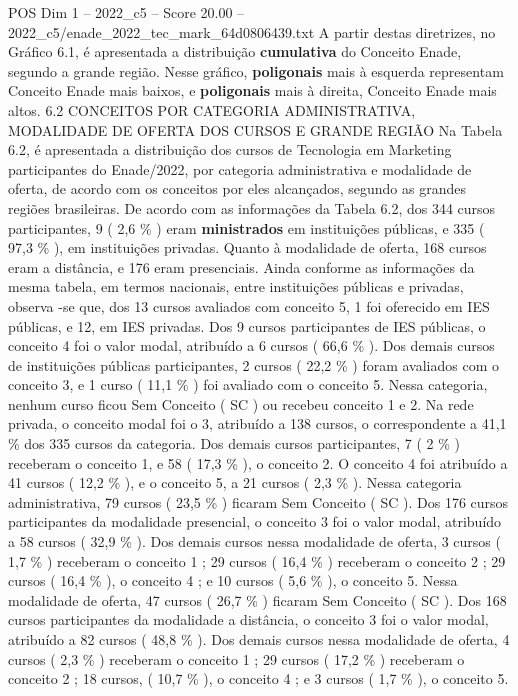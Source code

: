 \begin{textsample}{POS Dim 1 – 2022\_c5 – Score 20.00 – 2022\_c5/enade\_2022\_tec\_mark\_64d0806439.txt}
A partir destas diretrizes, no Gráfico 6.1, é apresentada a distribuição \textbf{cumulativa} do Conceito Enade, segundo a grande região.
Nesse gráfico, \textbf{poligonais} mais à esquerda representam Conceito Enade mais baixos, e \textbf{poligonais} mais à direita, Conceito Enade mais altos. 6.2 CONCEITOS POR CATEGORIA ADMINISTRATIVA, MODALIDADE DE OFERTA DOS CURSOS E GRANDE REGIÃO Na Tabela 6.2, é apresentada a distribuição dos cursos de Tecnologia em Marketing participantes do Enade/2022, por categoria administrativa e modalidade de oferta, de acordo com os conceitos por eles alcançados, segundo as grandes regiões brasileiras.
De acordo com as informações da Tabela 6.2, dos 344 cursos participantes, 9 ( 2,6 \% ) eram \textbf{ministrados} em instituições públicas, e 335 ( 97,3 \% ), em instituições privadas.
Quanto à modalidade de oferta, 168 cursos eram a distância, e 176 eram presenciais.
Ainda conforme as informações da mesma tabela, em termos nacionais, entre instituições públicas e privadas, observa -se que, dos 13 cursos avaliados com conceito 5, 1 foi oferecido em IES públicas, e 12, em IES privadas.
Dos 9 cursos participantes de IES públicas, o conceito 4 foi o valor modal, atribuído a 6 cursos ( 66,6 \% ).
Dos demais cursos de instituições públicas participantes, 2 cursos ( 22,2 \% ) foram avaliados com o conceito 3, e 1 curso ( 11,1 \% ) foi avaliado com o conceito 5.
Nessa categoria, nenhum curso ficou Sem Conceito ( SC ) ou recebeu conceito 1 e 2.
Na rede privada, o conceito modal foi o 3, atribuído a 138 cursos, o correspondente a 41,1 \% dos 335 cursos da categoria.
Dos demais cursos participantes, 7 ( 2 \% ) receberam o conceito 1, e 58 ( 17,3 \% ), o conceito 2.
O conceito 4 foi atribuído a 41 cursos ( 12,2 \% ), e o conceito 5, a 21 cursos ( 2,3 \% ).
Nessa categoria administrativa, 79 cursos ( 23,5 \% ) ficaram Sem Conceito ( SC ).
Dos 176 cursos participantes da modalidade presencial, o conceito 3 foi o valor modal, atribuído a 58 cursos ( 32,9 \% ).
Dos demais cursos nessa modalidade de oferta, 3 cursos ( 1,7 \% ) receberam o conceito 1 ; 29 cursos ( 16,4 \% ) receberam o conceito 2 ; 29 cursos ( 16,4 \% ), o conceito 4 ; e 10 cursos ( 5,6 \% ), o conceito 5.
Nessa modalidade de oferta, 47 cursos ( 26,7 \% ) ficaram Sem Conceito ( SC ).
Dos 168 cursos participantes da modalidade a distância, o conceito 3 foi o valor modal, atribuído a 82 cursos ( 48,8 \% ).
Dos demais cursos nessa modalidade de oferta, 4 cursos ( 2,3 \% ) receberam o conceito 1 ; 29 cursos ( 17,2 \% ) receberam o conceito 2 ; 18 cursos, ( 10,7 \% ), o conceito 4 ; e 3 cursos ( 1,7 \% ), o conceito 5.

\end{textsample}
